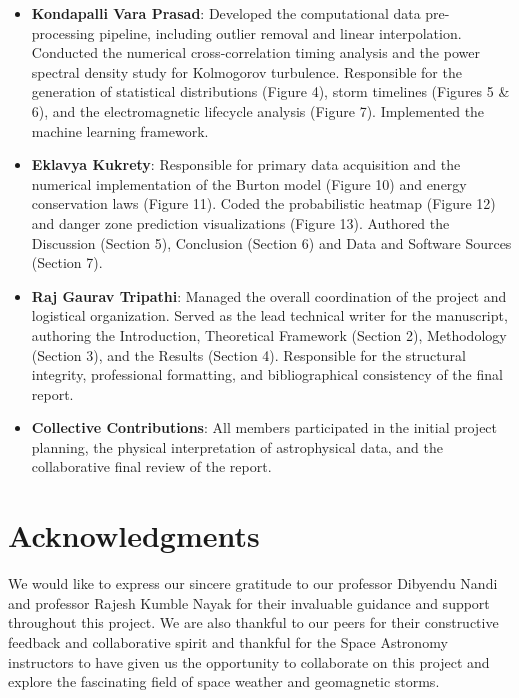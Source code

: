 \documentclass[12pt]{article}
\begin{document}
\begin{itemize}
    \item \textbf{Kondapalli Vara Prasad}: Developed the computational data pre-processing pipeline, including outlier removal and linear interpolation. Conducted the numerical cross-correlation timing analysis and the power spectral density study for Kolmogorov turbulence. Responsible for the generation of statistical distributions (Figure 4), storm timelines (Figures 5 \& 6), and the electromagnetic lifecycle analysis (Figure 7). Implemented the machine learning framework.
    
    \item \textbf{Eklavya Kukrety}: Responsible for primary data acquisition and the numerical implementation of the Burton model (Figure 10) and energy conservation laws (Figure 11). Coded the probabilistic heatmap (Figure 12) and danger zone prediction visualizations (Figure 13). Authored the Discussion (Section 5), Conclusion (Section 6) and Data and Software Sources (Section 7).
    
    \item \textbf{Raj Gaurav Tripathi}: Managed the overall coordination of the project and logistical organization. Served as the lead technical writer for the manuscript, authoring the Introduction, Theoretical Framework (Section 2), Methodology (Section 3), and the Results (Section 4). Responsible for the structural integrity, professional formatting, and bibliographical consistency of the final report.
    
    \item \textbf{Collective Contributions}: All members participated in the initial project planning, the physical interpretation of astrophysical data, and the collaborative final review of the report.
\end{itemize}



\section{Acknowledgments}
We would like to express our sincere gratitude to our professor Dibyendu Nandi and professor Rajesh Kumble Nayak for their invaluable guidance and support throughout this project. We are also thankful to our peers for their constructive feedback and collaborative spirit and thankful for the Space Astronomy instructors to have given us the opportunity to collaborate on this project and explore the fascinating field of space weather and geomagnetic storms. 
\end{document}

